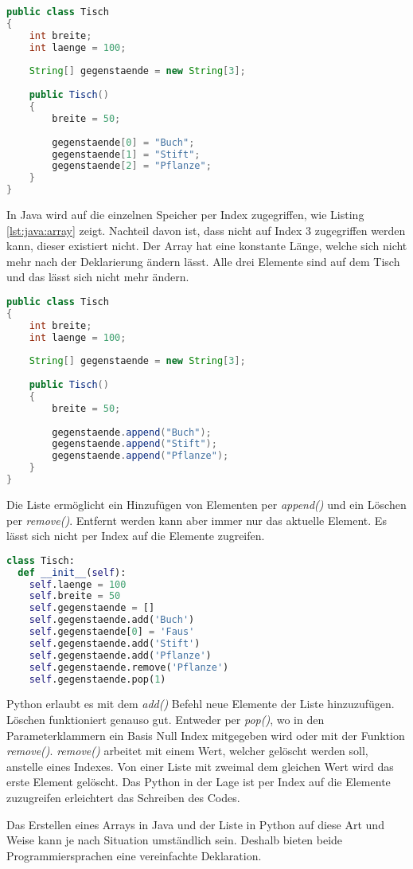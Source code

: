 \begin{lstlisting}[language=java,caption={Array in Java},captionpos=b,label={lst:java:array},frame=none]
public class Tisch
{
    int breite;
    int laenge = 100;
  
    String[] gegenstaende = new String[3];
  
    public Tisch()
    {
        breite = 50;
    
        gegenstaende[0] = "Buch";
        gegenstaende[1] = "Stift";
        gegenstaende[2] = "Pflanze";
    }
}
\end{lstlisting}

In Java wird auf die einzelnen Speicher per Index zugegriffen, wie Listing \ref{lst:java:array} zeigt. Nachteil davon ist, dass nicht auf Index 3 zugegriffen werden kann, dieser existiert nicht. Der Array hat eine konstante Länge, welche sich nicht mehr nach der Deklarierung ändern lässt. Alle drei Elemente sind auf dem Tisch und das lässt sich nicht mehr ändern.
\newpage
\begin{lstlisting}[language=java,caption={Liste in Java},captionpos=b,label={lst:java:liste},frame=none]
public class Tisch
{
    int breite;
    int laenge = 100;
  
    String[] gegenstaende = new String[3];
  
    public Tisch()
    {
        breite = 50;
    
        gegenstaende.append("Buch");
        gegenstaende.append("Stift");
        gegenstaende.append("Pflanze");
    }
}
\end{lstlisting}

Die Liste ermöglicht ein Hinzufügen von Elementen per \textit{append()} und ein Löschen per \textit{remove()}. Entfernt werden kann aber immer nur das aktuelle Element. Es lässt sich nicht per Index auf die Elemente zugreifen.

\begin{lstlisting}[language=python,caption={Liste in Python},captionpos=b,label={lst:python:liste},frame=none]
class Tisch:
  def __init__(self):
    self.laenge = 100
    self.breite = 50
    self.gegenstaende = []
    self.gegenstaende.add('Buch')
    self.gegenstaende[0] = 'Faus'
    self.gegenstaende.add('Stift')
    self.gegenstaende.add('Pflanze')
    self.gegenstaende.remove('Pflanze')
    self.gegenstaende.pop(1)
\end{lstlisting}

Python erlaubt es mit dem \textit{add()} Befehl neue Elemente der Liste hinzuzufügen. Löschen funktioniert genauso gut. Entweder per \textit{pop()}, wo in den Parameterklammern ein Basis Null Index mitgegeben wird oder mit der Funktion \textit{remove()}. \textit{remove()} arbeitet mit einem Wert, welcher gelöscht werden soll, anstelle eines Indexes. Von einer Liste mit zweimal dem gleichen Wert wird das erste Element gelöscht. Das Python in der Lage ist per Index auf die Elemente zuzugreifen erleichtert das Schreiben des Codes.\par
Das Erstellen eines Arrays in Java und der Liste in Python auf diese Art und Weise kann je nach Situation umständlich sein. Deshalb bieten beide Programmiersprachen eine vereinfachte Deklaration.\newpage

